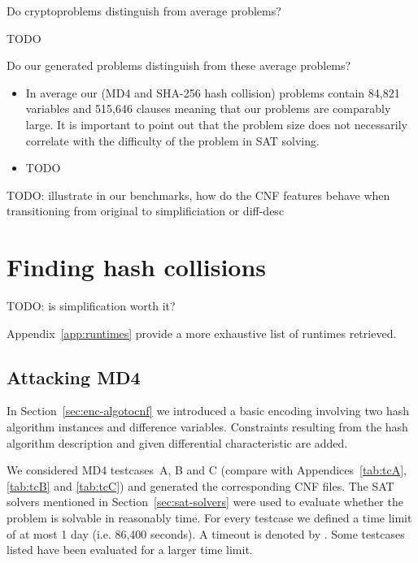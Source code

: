 Do cryptoproblems distinguish from average problems?

TODO

Do our generated problems distinguish from these average problems?

\begin{itemize}
  \item In average our (MD4 and SHA-256 hash collision) problems contain
        84,821 variables and 515,646 clauses meaning that our problems
        are comparably large. It is important to point out that the
        problem size does not necessarily correlate with the difficulty
        of the problem in SAT solving.
  \item TODO
\end{itemize}

TODO: illustrate in our benchmarks, how do the CNF features behave when transitioning from original to simplificiation or diff-desc

\section{Finding hash collisions}
\label{sec:results-attacks}

TODO: is simplification worth it?

Appendix~\ref{app:runtimes} provide a more exhaustive list of runtimes retrieved.

\subsection{Attacking MD4}
\label{sec:results-md4}
%
In Section~\ref{sec:enc-algotocnf} we introduced a basic encoding involving two hash algorithm
instances and difference variables. Constraints resulting from the hash algorithm description
and given differential characteristic are added.

We considered MD4 testcases~A, B and C (compare with Appendices~\ref{tab:tcA}, \ref{tab:tcB} and \ref{tab:tcC})
and generated the corresponding CNF files. The SAT solvers mentioned in Section~\ref{sec:sat-solvers}
were used to evaluate whether the problem is solvable in reasonably time. For every testcase we
defined a time limit of at most 1 day (i.e. 86,400 seconds). A timeout is denoted by \timeout.
Some testcases listed have been evaluated for a larger time limit.

